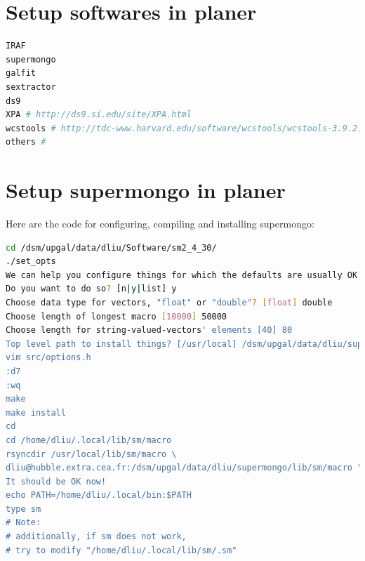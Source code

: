 \documentclass[11pt,a4paper]{article}
\begin{document}
%


\clearpage

\appendix

\section{Setup softwares in planer}
\label{Appendix_Software_Dependencies}

\begin{lstlisting}[language=bash]
IRAF
supermongo
galfit
sextractor
ds9
XPA # http://ds9.si.edu/site/XPA.html
wcstools # http://tdc-www.harvard.edu/software/wcstools/wcstools-3.9.2.tar.gz
others # 
\end{lstlisting}


\clearpage

\section{Setup supermongo in planer}
\label{Appendix_Supermongo}

Here are the code for configuring, compiling and installing supermongo: 

\begin{lstlisting}[language=bash]
cd /dsm/upgal/data/dliu/Software/sm2_4_30/
./set_opts
We can help you configure things for which the defaults are usually OK
Do you want to do so? [n|y|list] y
Choose data type for vectors, "float" or "double"? [float] double
Choose length of longest macro [10000] 50000
Choose length for string-valued-vectors' elements [40] 80
Top level path to install things? [/usr/local] /dsm/upgal/data/dliu/supermongo
vim src/options.h
:d7
:wq
make
make install
cd
cd /home/dliu/.local/lib/sm/macro
rsyncdir /usr/local/lib/sm/macro \
dliu@hubble.extra.cea.fr:/dsm/upgal/data/dliu/supermongo/lib/sm/macro "*.sm"
It should be OK now!
echo PATH=/home/dliu/.local/bin:$PATH
type sm
# Note:
# additionally, if sm does not work, 
# try to modify "/home/dliu/.local/lib/sm/.sm"
\end{lstlisting}
\end{document}
